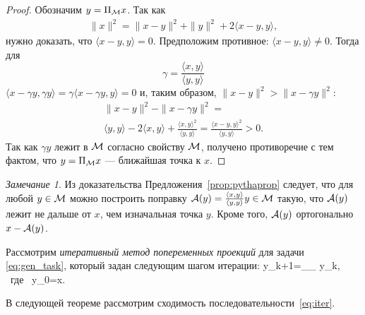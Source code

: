 \documentclass[12pt, specialist, subf,href,colorlinks=true,substylefile = spbu.rtx]{disser}
\theoremstyle{remark}
\newtheorem{remark}{Замечание}
\theoremstyle{definition}
\begin{document}
\begin{proof}
	Обозначим $y = \Pi_{\mathcal{M}} x$. Так как
	\begin{gather*}
	\|x\|^2 = \|x - y \|^2 + \|y \|^2 + 2 \langle x - y, y \rangle,
	\end{gather*}
	нужно доказать, что $\langle x - y, y \rangle = 0$.
	Предположим противное: $\langle x - y, y \rangle \ne 0$. Тогда для
	\begin{equation*}
	\gamma = \frac{\langle x, y \rangle}{\langle y, y \rangle}
	\end{equation*}
	$\langle x - \gamma y, \gamma y \rangle = \gamma \langle x - \gamma y, y \rangle = 0$
	и, таким образом, $\|x - y\|^2 > \|x - \gamma y\|^2$:
	\begin{gather*}
	\|x - y\|^2 - \|x - \gamma y\|^2 = \\\langle y, y \rangle - 2 \langle x, y \rangle + \frac{\langle x, y \rangle ^ 2}{\langle y, y \rangle} =
	\frac{\langle x - y, y \rangle^2}{\langle y, y \rangle} > 0.
	\end{gather*}
	Так как $\gamma y$ лежит в $\mathcal{M}$ согласно свойству $\mathcal{M}$,
	получено противоречие с тем фактом, что $y = \Pi_{\mathcal{M}} x$ --- ближайшая точка к $x$.
\end{proof}

\begin{remark}
	\label{rem:adj}
	Из доказательства Предложения~\ref{prop:pythaprop} следует, что для любой $y\in \mathcal{M}$ можно построить поправку $\mathcal{A}(y)=\frac{\langle x, y \rangle}{\langle y, y \rangle} y \in \mathcal{M}$ такую, что $\mathcal{A}(y)$
	лежит не дальше от $x$, чем изначальная точка $y$. Кроме того, $\mathcal{A}(y)$ ортогонально $x - \mathcal{A}(y)$.
	\end{remark}

Рассмотрим \emph{итеративный метод попеременных проекций} для задачи \eqref{eq:gen_task},
который задан следующим шагом итерации:
\be
\label{eq:iter}
y_{k+1}=\Pi_\calH \Pi_{\calM} y_{k}, \mbox{\ где\ } y_{0}=x.
\ee

В следующей теореме рассмотрим сходимость последовательности~\eqref{eq:iter}.
\end{document}
